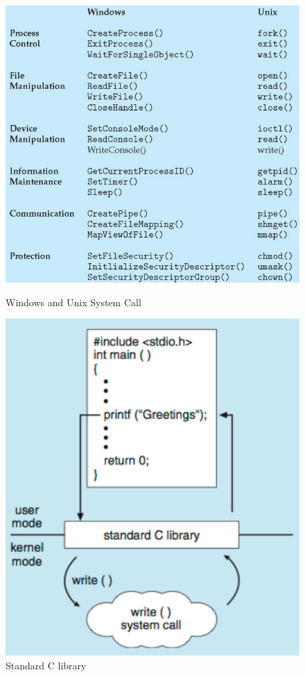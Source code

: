 \begin{figure}[htbp]
    \begin{minipage}[htbp]{0.5\textwidth}
        \centering
        \includegraphics[width=0.9\linewidth]{img/SC.png}
    \caption{Windows and Unix System Call}
    \end{minipage}
    \begin{minipage}[htbp]{0.5\textwidth}
    \centering

    \includegraphics[width=0.8\linewidth]{img/print.png}
    \caption{Standard C library}       
    \end{minipage}
\end{figure}


